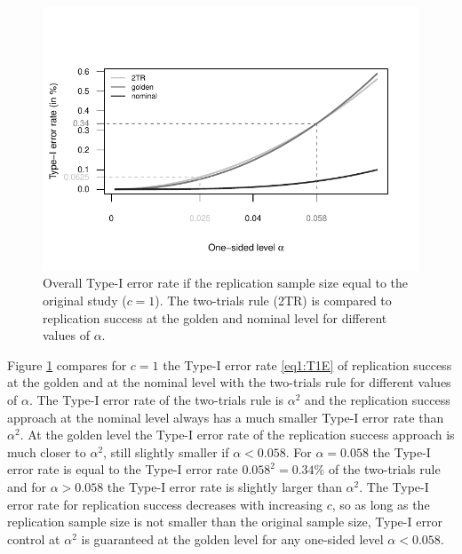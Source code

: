 \begin{figure}[!ht]
\begin{center}

\begin{knitrout}
\color{fgcolor}

{\centering \includegraphics[width=\maxwidth]{images/paper1/fig5-1}

}


\end{knitrout}

\end{center}
\caption{Overall Type-I error rate if the replication sample size equal to the
  original study ($c=1$). The two-trials rule (2TR) is compared to replication
  success at the golden and nominal level for different values of $\alpha$.}
\label{fig1:fig5}
\end{figure}

Figure \ref{fig1:fig5} compares for $c=1$ the Type-I error rate \eqref{eq1:T1E} of
replication success at the golden and at the nominal level with the two-trials
rule for different values of $\alpha$. The Type-I error rate of the two-trials
rule is $\alpha^2$ and the replication success approach at the nominal level
always has a much smaller Type-I error rate than $\alpha^2$. At the golden level
the Type-I error rate of the replication success approach is much closer to
$\alpha^2$, still slightly smaller if $\alpha < 0.058$. For $\alpha = 0.058$ the
Type-I error rate is equal to the Type-I error rate $0.058^2 = 0.34\%$ of the
two-trials rule and for $\alpha > 0.058$ the Type-I error rate is slightly
larger than $\alpha^2$. The Type-I error rate for replication success decreases
with increasing $c$, so as long as the replication sample size is not smaller
than the original sample size, Type-I error control at $\alpha^2$ is guaranteed
at the golden level for any one-sided level $\alpha < 0.058$.

